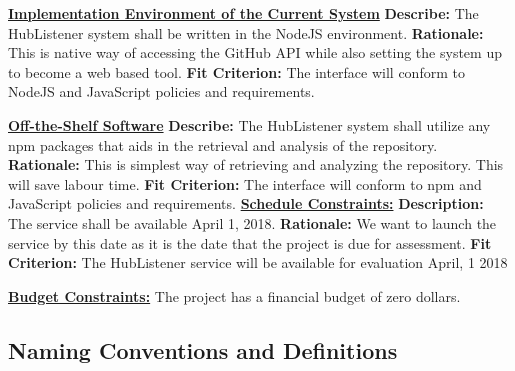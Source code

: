 \documentclass{article}
\begin{document}
\noindent
\textbf{\underline{Implementation Environment of the Current System}}\newline
\textbf{Describe:} The HubListener system shall be written in the NodeJS environment.\newline
\textbf{Rationale:} This is native way of accessing the GitHub API while also setting the system up to become a web based tool.\newline 
\textbf{Fit Criterion:} The interface will conform to NodeJS and JavaScript policies and requirements. \newline

\noindent
\textbf{\underline{Off-the-Shelf Software}}\newline
\textbf{Describe:} The HubListener system shall utilize any npm packages that aids in the retrieval and analysis of the repository. \newline
\textbf{Rationale:} This is simplest way of retrieving and analyzing the repository. This will save labour time.\newline
\textbf{Fit Criterion:} The interface will conform to npm and JavaScript policies and requirements. \newline
\fi
\noindent
\textbf{\underline{Schedule Constraints:}}\newline
\textbf{Description:} The service shall be available April 1, 2018.\newline
\textbf{Rationale:} We want to launch the service by this date as it is the date that the project is due for assessment.\newline
\textbf{Fit Criterion:} The HubListener service will be available for evaluation April, 1 2018 \newline

\noindent
\textbf{\underline{Budget Constraints:}} 
The project has a financial budget of zero dollars. 
\newpage
\subsection{Naming Conventions and Definitions}
\end{document}
